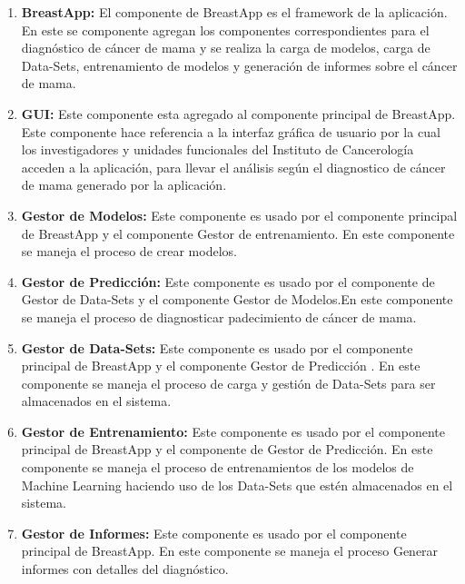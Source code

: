 \begin{enumerate}[label=\textbf{\arabic*})]

\item  \textbf{BreastApp:} El componente de BreastApp es el framework  de la aplicación. En este se componente agregan los componentes correspondientes para el diagnóstico de cáncer de mama y se realiza la carga de modelos, carga de Data-Sets, entrenamiento de modelos  y generación de informes  sobre el cáncer de mama.
\item  \textbf{GUI:} Este componente esta agregado al componente principal de BreastApp. Este componente hace referencia a la interfaz gráfica de usuario por la cual los investigadores y unidades funcionales del Instituto  de Cancerología acceden a la aplicación, para llevar el análisis según el diagnostico de cáncer de mama generado por la aplicación.

\item  \textbf{Gestor de Modelos:} Este componente es usado por el componente principal de BreastApp y el componente Gestor de entrenamiento. En este componente se maneja el proceso de crear modelos.

\item  \textbf{Gestor de Predicción:} Este componente es usado por el componente de Gestor de Data-Sets y el componente Gestor de Modelos.En este componente se maneja el proceso de diagnosticar padecimiento de cáncer de mama.

\item  \textbf{Gestor de Data-Sets:} Este componente es usado por el componente principal de BreastApp y el componente Gestor de Predicción . En este componente se maneja el proceso de carga  y gestión de Data-Sets para ser almacenados en el sistema.

\item  \textbf{Gestor de Entrenamiento:} Este componente es usado por el componente principal de BreastApp y  el componente de Gestor de Predicción. En este componente se maneja el proceso de entrenamientos de los modelos de Machine Learning haciendo uso de los Data-Sets  que estén almacenados en el sistema.

\item  \textbf{Gestor de Informes:} Este componente es usado por el componente principal de BreastApp. En este componente se maneja el proceso Generar informes con detalles del diagnóstico.

\end{enumerate}


